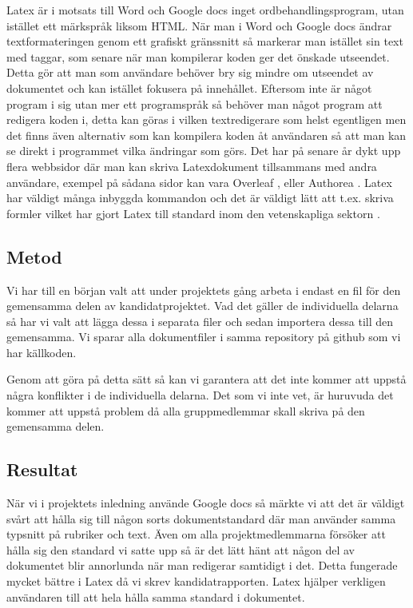 Latex är i motsats till Word och Google docs inget ordbehandlingsprogram, utan istället ett märkspråk liksom HTML. När man i Word och Google docs 
ändrar textformateringen genom ett grafiskt gränssnitt så markerar man istället sin text med taggar, som senare när man kompilerar koden ger
det önskade utseendet. Detta gör att man som användare behöver bry sig mindre om utseendet av dokumentet och kan istället fokusera på innehållet.
Eftersom inte är något program i sig utan mer ett programspråk så behöver man något program att redigera koden i, detta kan göras i vilken textredigerare som helst egentligen men det finns även alternativ som kan kompilera koden åt användaren så att man kan se direkt i programmet vilka ändringar som görs. Det har på senare år dykt upp flera webbsidor där man kan skriva Latexdokument tillsammans med andra användare, exempel på sådana sidor kan vara Overleaf \cite{overleaf}, eller Authorea \cite{authorea}. Latex har väldigt många inbyggda kommandon och det är väldigt lätt att t.ex. skriva formler vilket har gjort Latex till standard inom den vetenskapliga sektorn \cite{latex_standard}.


\subsection{Metod}
Vi har till en början valt att under projektets gång arbeta i endast en fil för den gemensamma delen av kandidatprojektet. Vad det gäller 
de individuella delarna så har vi valt att lägga dessa i separata filer och sedan importera dessa till den gemensamma. Vi 
sparar alla dokumentfiler i samma repository på github som vi har källkoden.

Genom att göra på detta sätt så kan vi garantera att det inte kommer att uppstå några konflikter i de individuella delarna.
Det som vi inte vet, är huruvuda det kommer att uppstå problem då alla gruppmedlemmar skall skriva på den gemensamma delen.

\subsection{Resultat}
När vi i projektets inledning använde Google docs så märkte vi att det är väldigt svårt att hålla sig till någon sorts dokumentstandard där man använder samma typsnitt på rubriker och text. Även om alla projektmedlemmarna försöker att hålla sig den standard vi satte upp så är det lätt hänt att någon del av dokumentet blir annorlunda när man redigerar samtidigt i det. Detta fungerade mycket bättre i Latex då vi skrev kandidatrapporten. Latex hjälper verkligen användaren till att hela hålla samma standard i dokumentet.


